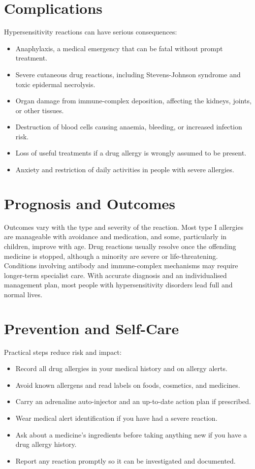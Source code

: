 \section*{Complications}
Hypersensitivity reactions can have serious consequences:

\begin{itemize}
    \item Anaphylaxis, a medical emergency that can be fatal without prompt treatment.
    \item Severe cutaneous drug reactions, including Stevens-Johnson syndrome and toxic epidermal necrolysis.
    \item Organ damage from immune-complex deposition, affecting the kidneys, joints, or other tissues.
    \item Destruction of blood cells causing anaemia, bleeding, or increased infection risk.
    \item Loss of useful treatments if a drug allergy is wrongly assumed to be present.
    \item Anxiety and restriction of daily activities in people with severe allergies.
\end{itemize}

\section*{Prognosis and Outcomes}
Outcomes vary with the type and severity of the reaction. Most type I allergies are manageable with avoidance and medication, and some, particularly in children, improve with age. Drug reactions usually resolve once the offending medicine is stopped, although a minority are severe or life-threatening. Conditions involving antibody and immune-complex mechanisms may require longer-term specialist care. With accurate diagnosis and an individualised management plan, most people with hypersensitivity disorders lead full and normal lives.

\section*{Prevention and Self-Care}
Practical steps reduce risk and impact:

\begin{itemize}
    \item Record all drug allergies in your medical history and on allergy alerts.
    \item Avoid known allergens and read labels on foods, cosmetics, and medicines.
    \item Carry an adrenaline auto-injector and an up-to-date action plan if prescribed.
    \item Wear medical alert identification if you have had a severe reaction.
    \item Ask about a medicine's ingredients before taking anything new if you have a drug allergy history.
    \item Report any reaction promptly so it can be investigated and documented.
\end{itemize}

